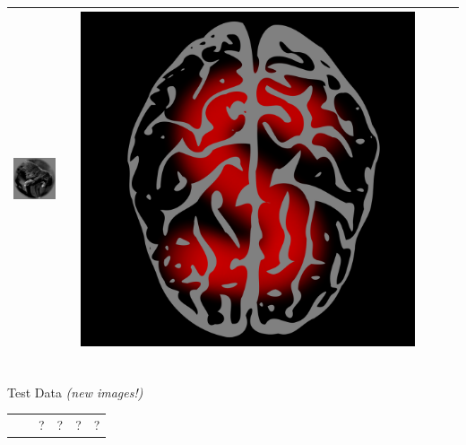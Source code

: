 \documentclass{beamer}
\begin{document}
\begin{frame}
\begin{center}
\begin{tabular}{ccc||ccc}
\includegraphics[scale = .26]{img4.png} & \hspace{0.2in} & \includegraphics[scale = 0.035]{brain5.png} \\ \hline
\end{tabular}\\
\vspace{0.1in}
Test Data \emph{(new images!)} \\
\begin{tabular}{c|c|cccc}
\hline
 & & ? & ? & ? & ? \\

\end{tabular}
\end{center}
\end{frame}
\end{document}
